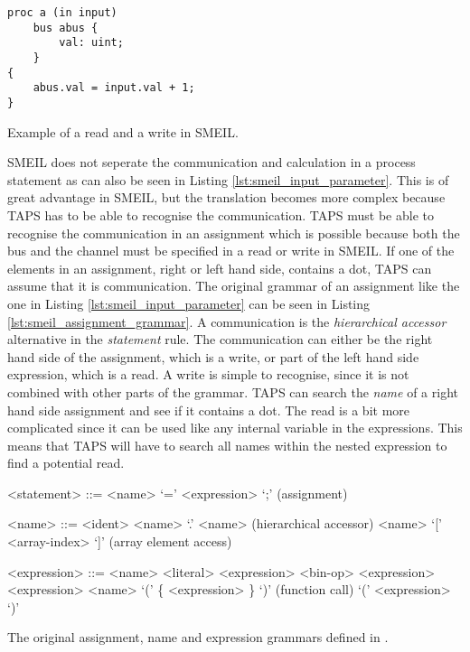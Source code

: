 \begin{listing}
\begin{verbatim}
proc a (in input)
    bus abus {
        val: uint;
    }
{
    abus.val = input.val + 1;
}
\end{verbatim}
\caption{Example of a read and a write in SMEIL.}
\label{lst:smeil_input_parameter}
\end{listing}
SMEIL does not seperate the communication and calculation in a process statement as can also be seen in Listing \ref{lst:smeil_input_parameter}. This is of great advantage in SMEIL, but the translation becomes more complex because TAPS has to be able to recognise the communication.
TAPS must be able to recognise the communication in an assignment which is possible because both the bus and the channel must be specified in a read or write in SMEIL. If one of the elements in an assignment, right or left hand side, contains a dot, TAPS can assume that it is communication. The original grammar of an assignment like the one in Listing \ref{lst:smeil_input_parameter} can be seen in Listing \ref{lst:smeil_assignment_grammar}. A communication is the \textit{hierarchical accessor} alternative in the \textit{statement} rule. The communication can either be the right hand side of the assignment, which is a write, or part of the left hand side expression, which is a read. A write is simple to recognise, since it is not combined with other parts of the grammar. TAPS can search the \textit{name} of a right hand side assignment and see if it contains a dot. The read is a bit more complicated since it can be used like any internal variable in the expressions. This means that TAPS will have to search all names within the nested expression to find a potential read.
\begin{listing}
\begin{grammar}
<statement> ::= <name> `=' <expression> `;' (assignment)

<name> ::= <ident>
\alt <name> `.' <name> (hierarchical accessor)
\alt <name> `[' <array-index> `]' (array element access)

<expression> ::= <name>
\alt <literal>
\alt <expression> <bin-op> <expression>
 <expression>
\alt <name> `(' \{ <expression> \}  `)' (function call)
\alt `(' <expression> `)'


\end{grammar}
\caption{The original assignment, name and expression grammars defined in \cite{Asheim2018}.}
\label{lst:smeil_assignment_grammar}
\end{listing}
